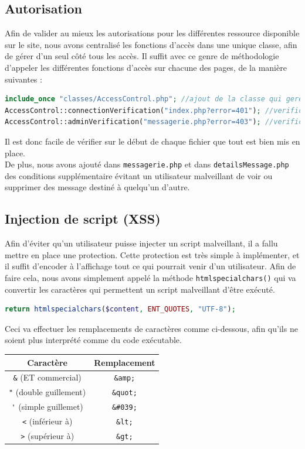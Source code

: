 \documentclass[a4paper,10pt]{article}
\begin{document}
    \subsection*{Autorisation}
    Afin de valider au mieux les autorisations pour les différentes ressource disponible sur le site, nous avons centralisé les fonctions d'accès dans une unique classe, afin de gérer d'un seul côté tous les accès. Il suffit avec ce genre de méthodologie d'appeler les différentes fonctions d'accès sur chacune des pages, de la manière suivantes : 
                        \begin{lstlisting}[language=php]
include_once "classes/AccessControl.php"; //ajout de la classe qui gere les autorisations
AccessControl::connectionVerification("index.php?error=401"); //verification de l'authentification
AccessControl::adminVerification("messagerie.php?error=403"); //verification de l'autorisation
\end{lstlisting} 
    Il est donc facile de vérifier sur le début de chaque fichier que tout est bien mis en place. \\

    De plus, nous avons ajouté dans \verb|messagerie.php| et dans \verb|detailsMessage.php| des conditions supplémentaire évitant un utilisateur malveillant de voir ou supprimer des message destiné à quelqu'un d'autre.
    \subsection*{Injection de script (XSS)}
    Afin d'éviter qu'un utilisateur puisse injecter un script malveillant, il a fallu mettre en place une protection. Cette protection est très simple à implémenter, et il suffit d'encoder à l'affichage tout ce qui pourrait venir d'un utilisateur. Afin de faire cela, nous avons simplement appelé la méthode \verb|htmlspecialchars()| qui va convertir les caractères qui permettent un script malveillant d'être exécuté. 
                        \begin{lstlisting}[language=php]
return htmlspecialchars($content, ENT_QUOTES, "UTF-8");
\end{lstlisting} 
Ceci va effectuer les remplacements de caractères comme ci-dessous, afin qu'ils ne soient plus interprété comme du code exécutable. 
    
\begin{center}
\begin{tabular}{|c c|} 
 \hline
 Caractère & Remplacement \\ [0.5ex] 
 \hline\hline
 \verb|&| (ET commercial) & \verb|&amp;|\\
 \hline
 \verb|"| (double guillement) & \verb|&quot;| \\
 \hline
 \verb|'| (simple guillemet) & \verb|&#039;| \\
 \hline
 \verb|<| (inférieur à) & \verb|&lt;|  \\
 \hline
 \verb|>| (supérieur à) & \verb|&gt;| \\
  \hline
\end{tabular}
\end{center} \\
\end{document}
